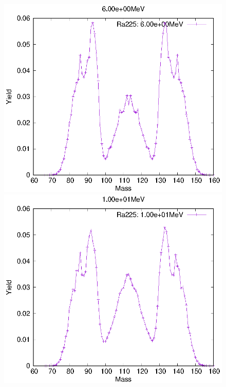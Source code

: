 \begin{figure}[htbp]
 \begin{minipage}{0.33\textwidth} \begin{center} \includegraphics[width=\textwidth]{YA/Ra225_6.00e+00.eps} \end{center} \end{minipage}
\begin{minipage}{0.33\textwidth} \begin{center} \includegraphics[width=\textwidth]{YA/Ra225_1.00e+01.eps} \end{center} \end{minipage}

\end{figure}
